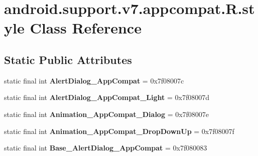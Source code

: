 \hypertarget{classandroid_1_1support_1_1v7_1_1appcompat_1_1_r_1_1style}{}\section{android.\+support.\+v7.\+appcompat.\+R.\+style Class Reference}
\label{classandroid_1_1support_1_1v7_1_1appcompat_1_1_r_1_1style}
\subsection*{Static Public Attributes}
\begin{DoxyCompactItemize}
\item 
\hypertarget{classandroid_1_1support_1_1v7_1_1appcompat_1_1_r_1_1style_a7a80ce426bb2017e2b8138a6b04a04c8}{}static final int {\bfseries Alert\+Dialog\+\_\+\+App\+Compat} = 0x7f08007c\label{classandroid_1_1support_1_1v7_1_1appcompat_1_1_r_1_1style_a7a80ce426bb2017e2b8138a6b04a04c8}

\item 
\hypertarget{classandroid_1_1support_1_1v7_1_1appcompat_1_1_r_1_1style_a5286b0af3aae6595cd012386e576a340}{}static final int {\bfseries Alert\+Dialog\+\_\+\+App\+Compat\+\_\+\+Light} = 0x7f08007d\label{classandroid_1_1support_1_1v7_1_1appcompat_1_1_r_1_1style_a5286b0af3aae6595cd012386e576a340}

\item 
\hypertarget{classandroid_1_1support_1_1v7_1_1appcompat_1_1_r_1_1style_adaf79da50296b63434dd1dd8d3b1e0da}{}static final int {\bfseries Animation\+\_\+\+App\+Compat\+\_\+\+Dialog} = 0x7f08007e\label{classandroid_1_1support_1_1v7_1_1appcompat_1_1_r_1_1style_adaf79da50296b63434dd1dd8d3b1e0da}

\item 
\hypertarget{classandroid_1_1support_1_1v7_1_1appcompat_1_1_r_1_1style_a6a35f583f9c5a6779203c4ab3bb33fe6}{}static final int {\bfseries Animation\+\_\+\+App\+Compat\+\_\+\+Drop\+Down\+Up} = 0x7f08007f\label{classandroid_1_1support_1_1v7_1_1appcompat_1_1_r_1_1style_a6a35f583f9c5a6779203c4ab3bb33fe6}

\item 
\hypertarget{classandroid_1_1support_1_1v7_1_1appcompat_1_1_r_1_1style_a057db4a6871979d848f88b8529f1d73f}{}static final int {\bfseries Base\+\_\+\+Alert\+Dialog\+\_\+\+App\+Compat} = 0x7f080083\label{classandroid_1_1support_1_1v7_1_1appcompat_1_1_r_1_1style_a057db4a6871979d848f88b8529f1d73f}


\end{DoxyCompactItemize}
